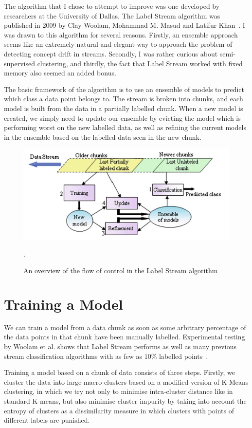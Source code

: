 \documentclass[12pt,a4paper,oneside]{report}
\begin{document}
The algorithm that I chose to attempt to improve was one developed by researchers at the University of Dallas. The Label Stream algorithm was published in 2009 by Clay Woolam, Mohammad M. Masud and Latifur Khan~\cite{LabStr}. I was drawn to this algorithm for several reasons. Firstly, an ensemble approach seems like an extremely natural and elegant way to approach the problem of detecting concept drift in streams. Secondly, I was rather curious about semi-supervised clustering, and thirdly, the fact that Label Stream worked with fixed memory also seemed an added bonus.

The basic framework of the algorithm is to use an ensemble of models to predict which class a data point belongs to. The stream is broken into chunks, and each model is built from the data in a partially labelled chunk.  When a new model is created, we simply need to update our ensemble by evicting the model which is performing worst on the new labelled data, as well as refining the current models in the ensemble based on the labelled data seen in the new chunk. 
\begin{figure}
	\includegraphics[scale = 0.4]{LabStrOverview}
	\caption{An overview of the flow of control in the Label Stream algorithm \cite{TechRep}}.
\end{figure}

\section*{Training a Model}

We can train a model from a data chunk as soon as some arbitrary percentage of the data points in that chunk have been manually labelled. Experimental testing by Woolam et al. shows that Label Stream performs as well as many previous stream classification algorithms with as few as \(10\%\) labelled points~\cite{LabStr}.

Training a model based on a chunk of data consists of three steps. Firstly, we cluster the data into large macro-clusters based on a modified version of K-Means clustering, in which we try not only to minimise intra-cluster distance like in standard K-means, but also minimise cluster impurity by taking into account the entropy of clusters as a dissimilarity measure in which clusters with points of different labels are punished. 
\end{document}
